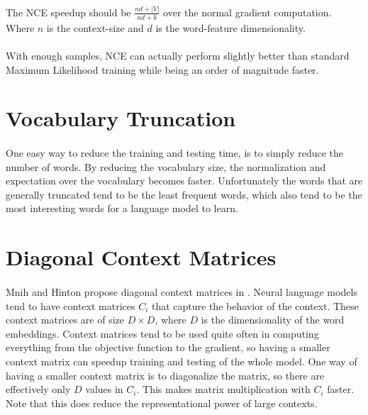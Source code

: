 \paragraph{}
The NCE speedup should be $\frac{nd + |V|} {nd+ k}$ over the normal gradient computation. Where $n$ is the context-size and $d$ is the word-feature dimensionality.
\paragraph{}
With enough samples, NCE can actually perform slightly better than standard Maximum Likelihood training while being an order of magnitude faster.


\section{Vocabulary Truncation}
\paragraph{}
One easy way to reduce the training and testing time, is to simply reduce the number of words. By reducing the vocabulary size, the normalization and expectation over the vocabulary becomes faster. Unfortunately the words that are generally truncated tend to be the least frequent words, which also tend to be the most interesting words for a language model to learn.

\section{Diagonal Context Matrices}
\paragraph{}
Mnih and Hinton propose diagonal context matrices in \cite{MnihHinton2009}. Neural language models tend to have context matrices $C_i$ that capture the behavior of the context. These context matrices are of size $D \times D$, where $D$ is the dimensionality of the word embeddings. Context matrices tend to be used quite often in computing everything from the objective function to the gradient, so having a smaller context matrix can speedup training and testing of the whole model. One way of having a smaller context matrix is to diagonalize the matrix, so there are effectively only $D$ values in $C_i$. This makes matrix multiplication with $C_i$ faster. Note that this does reduce the representational power of large contexts.

